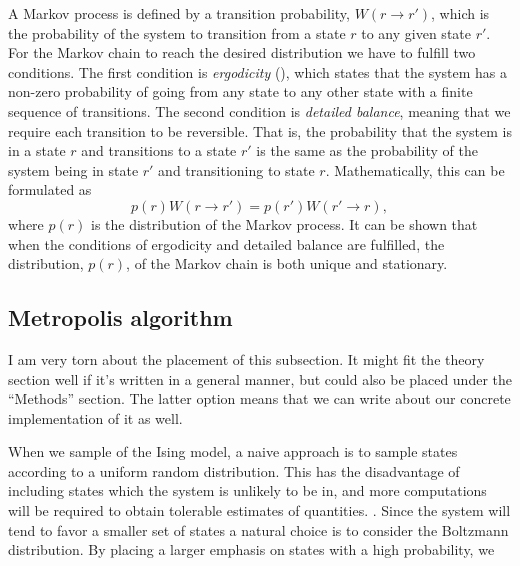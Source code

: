 A Markov process is defined by a transition probability, $W(r \to r')$, which is the probability of the system to transition from a state $r$ to any given state $r'$. For the Markov chain to reach the desired distribution we have to fulfill two conditions.  The first condition is \textit{ergodicity} (), which states that the system has a non-zero probability of going from any state to any other state with a finite sequence of transitions. The second condition is \textit{detailed balance}, meaning that we require each transition to be reversible. That is, the probability that the system is in a state $r$ and transitions to a state $r'$ is the same as the probability of the system being in state $r'$ and transitioning to state $r$. Mathematically, this can be formulated as 
\begin{equation}
    p(r)W(r\to r') = p(r') W(r'\to r), \label{eq:detailed_balance}
\end{equation} 
where $p(r)$ is the distribution of the Markov process. It can be shown that when the conditions of ergodicity and detailed balance are fulfilled, the distribution, $p(r)$, of the Markov chain is both unique and stationary. 

\subsection{Metropolis algorithm} \label{subsec_theory:metropolis_algorithm}
\alert{I am very torn about the placement of this subsection. It might fit the theory section well if it's written in a general manner, but could also be placed under the ``Methods'' section. The latter option means that we can write about our concrete implementation of it as well.}

When we sample  of the Ising model, a naive approach is to sample states  according to a uniform random distribution. This has the disadvantage of including  states which the system is unlikely to be in, and more computations will be required to obtain tolerable estimates of quantities. . Since the system will tend to favor a smaller set of states  a natural choice is to consider the Boltzmann distribution. By placing a larger emphasis on states with a high probability, we  


